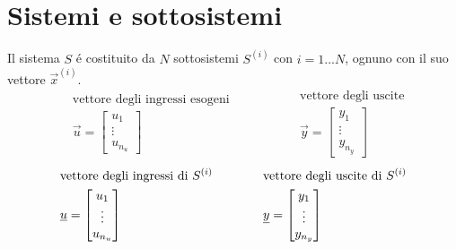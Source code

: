 \documentclass[../main.tex]{subfiles}
\begin{document}
	\section{Sistemi e sottosistemi}
	Il sistema $ S $ \'e costituito da $ N $ sottosistemi $ S^{(i)} $ con $ i = 1...N $, ognuno con il suo vettore $ \vec x^{(i)} $.
	\[
		\begin{aligned}
			&\text{vettore degli ingressi esogeni}
			\\
			&\vec u =
			\begin{bmatrix}
				u_1\\
				\vdots\\
				u_{n_u}
			\end{bmatrix}
		\end{aligned}
		\qquad\qquad
		\begin{aligned}
			&\text{vettore degli uscite}
			\\
			&\vec y =
			\begin{bmatrix}
				y_1\\
				\vdots\\
				y_{n_y}
			\end{bmatrix}
		\end{aligned}
	\]
	\[
		\begin{aligned}
			&\text{vettore degli ingressi di $ S^{(i)} $}
			\\
			&\vec u =
			\begin{bmatrix}
				u_1\\
				\vdots\\
				u_{n_u}
			\end{bmatrix}
		\end{aligned}
		\qquad\qquad
		\begin{aligned}
			&\text{vettore degli uscite di $ S^{(i)} $}
			\\
			&\vec y =
			\begin{bmatrix}
				y_1\\
				\vdots\\
				y_{n_y}
			\end{bmatrix}
		\end{aligned}
	\]
	
\end{document}
